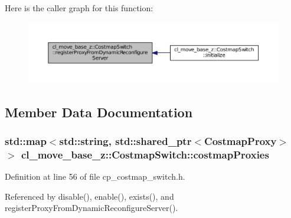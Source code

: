 Here is the caller graph for this function\+:
\nopagebreak
\begin{figure}[H]
\begin{center}
\leavevmode
\includegraphics[width=350pt]{classcl__move__base__z_1_1CostmapSwitch_a0d04ca7b655f850ba3107393f1c437cb_icgraph}
\end{center}
\end{figure}




\subsection{Member Data Documentation}
\subsubsection[{\texorpdfstring{costmap\+Proxies}{costmapProxies}}]{\setlength{\rightskip}{0pt plus 5cm}std\+::map$<$std\+::string, std\+::shared\+\_\+ptr$<${\bf Costmap\+Proxy}$>$ $>$ cl\+\_\+move\+\_\+base\+\_\+z\+::\+Costmap\+Switch\+::costmap\+Proxies\hspace{0.3cm}{\ttfamily [private]}}\hypertarget{classcl__move__base__z_1_1CostmapSwitch_a3a574ac1f7f3eff19cdf7ad0e15297e4}{}\label{classcl__move__base__z_1_1CostmapSwitch_a3a574ac1f7f3eff19cdf7ad0e15297e4}


Definition at line 56 of file cp\+\_\+costmap\+\_\+switch.\+h.



Referenced by disable(), enable(), exists(), and register\+Proxy\+From\+Dynamic\+Reconfigure\+Server().

